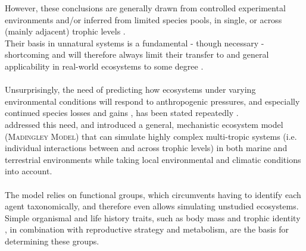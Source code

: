 However, these conclusions are generally drawn from controlled experimental environments and/or inferred from limited species pools, in single, or across (mainly adjacent) trophic levels \citep[e.g.][]{Finke2005, Byrnes2006}.  \\
Their basis in unnatural systems is a fundamental - though necessary - shortcoming and will therefore always limit their transfer to and general applicability in real-world ecosystems to some degree \citep{Hillebrand2009}. 
 \\\\
 Unsurprisingly, the need of predicting how ecosystems under varying environmental conditions will respond to anthropogenic pressures, and especially continued species losses and gains \citep{Wardle2011}, has been stated repeatedly \citep[e.g.][]{Hooper2012,Naeem2012,Tilman2014}.\\
\cite{Harfoot2014} addressed this need, and introduced a general, mechanistic ecosystem model (\textsc{Madingley Model}) that can simulate highly complex multi-tropic systems (i.e. individual interactions between and across trophic levels) in both marine and terrestrial environments while taking local environmental and climatic conditions into account. \\\\
The model relies on functional groups, which circumvents having to identify each agent taxonomically, and therefore even allows simulating unstudied ecosystems. 
Simple organismal and life history traits, such as body mass and trophic identity  \citep[][shown to be adequate for explaining BEF relationships]{Berlow2009,Wood2010,Saguin2014,Legagneux2014}, in combination with reproductive strategy and metabolism, are the basis for determining these groups.
\\\\
